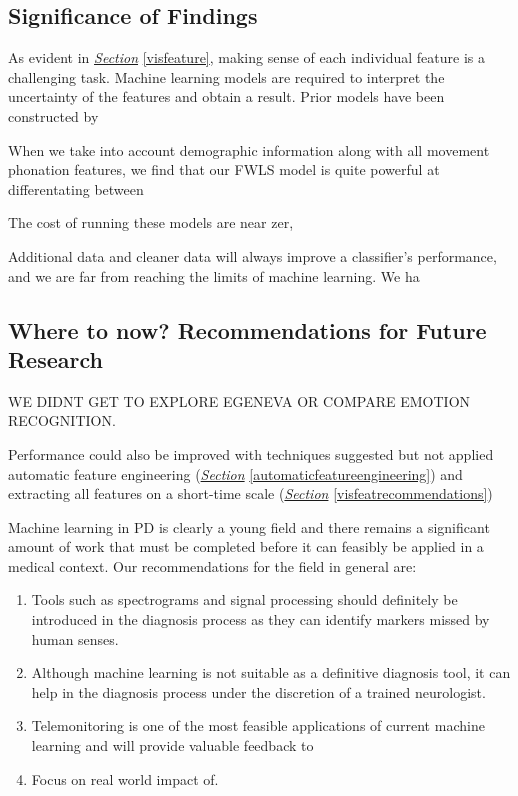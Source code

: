 \documentclass[12pt, twoside]{book}
\begin{document}
\subsection{Significance of Findings}

As evident in \textit{\hyperref[visfeature]{Section}} \ref{visfeature}, making sense of each individual feature is a challenging task. Machine learning models are required to interpret the uncertainty of the features and obtain a result. Prior models have been constructed by 


 When we take into account demographic information along with all movement phonation
features, we find that our FWLS model is quite powerful at differentating between 

 The cost of running these models are near zer, 


Additional data and cleaner data will always improve a classifier's performance, and we are far from reaching the limits of machine learning. We ha




\subsection{Where to now? Recommendations for Future Research}


WE DIDNT GET TO EXPLORE EGENEVA OR COMPARE EMOTION RECOGNITION.



Performance could also be improved with techniques suggested but not applied automatic feature engineering (\textit{\hyperref[automaticfeatureengineering]{Section}} \ref{automaticfeatureengineering}) and extracting all features on a short-time scale (\textit{\hyperref[visfeatrecommendations]{Section}} \ref{visfeatrecommendations}) 


Machine learning in PD is clearly a young field and there remains a significant amount of work that must be completed before it can feasibly be applied in a medical context. Our recommendations for the field in general are:

\begin{enumerate}[noitemsep, topsep=-10pt]
	\item Tools such as spectrograms and signal processing should definitely be introduced in the diagnosis process as they can identify markers missed by human senses.
	\item Although machine learning is not suitable as a definitive diagnosis tool, it can help in the diagnosis process under the discretion of a trained neurologist.
	\item Telemonitoring is one of the most feasible applications of current machine learning and will provide valuable feedback to 
	\item Focus on real world impact of.
\end{enumerate}
\end{document}
